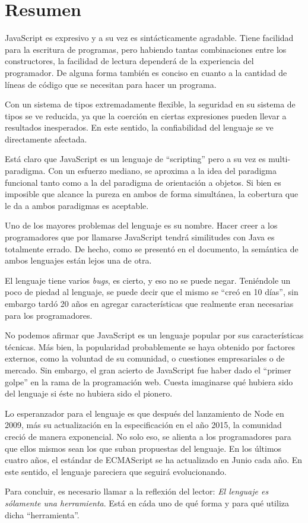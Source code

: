 \section{Resumen}

JavaScript es expresivo y a su vez es sintácticamente agradable. Tiene facilidad para la escritura de programas, pero habiendo tantas combinaciones entre los constructores, la facilidad de lectura dependerá de la experiencia del programador. De alguna forma también es conciso en cuanto a la cantidad de líneas de código que se necesitan para hacer un programa.

Con un sistema de tipos extremadamente flexible, la seguridad en su sistema de tipos se ve reducida, ya que la coerción en ciertas expresiones pueden llevar a resultados inesperados. En este sentido, la confiabilidad del lenguaje se ve directamente afectada. 

Está claro que JavaScript es un lenguaje de "`scripting"' pero a su vez es multi-paradigma. Con un esfuerzo mediano, se aproxima a la idea del paradigma funcional tanto como a la del paradigma de orientación a objetos. Si bien es imposible que alcance la pureza en ambos de forma simultánea, la cobertura que le da a ambos paradigmas es aceptable.

Uno de los mayores problemas del lenguaje es su nombre. Hacer creer a los programadores que por llamarse JavaScript tendrá similitudes con Java es totalmente errado. De hecho, como se presentó en el documento, la semántica de ambos lenguajes están lejos una de otra.

El lenguaje tiene varios \textit{bugs}, es cierto, y eso no se puede negar. Teniéndole un poco de piedad al lenguaje, se puede decir que el mismo se "`creó en 10 días"', sin embargo tardó 20 años en agregar características que realmente eran necesarias para los programadores. 

No podemos afirmar que JavaScript es un lenguaje popular por sus características técnicas. Más bien, la popularidad probablemente se haya obtenido por factores externos, como la voluntad de su comunidad, o cuestiones empresariales o de mercado. Sin embargo, el gran acierto de JavaScript fue haber dado el "`primer golpe"' en la rama de la programación web. Cuesta imaginarse qué hubiera sido del lenguaje si éste no hubiera sido el pionero.

Lo esperanzador para el lenguaje es que después del lanzamiento de Node en 2009, más su actualización en la especificación en el año 2015, la comunidad creció de manera exponencial. No solo eso, se alienta a los programadores para que ellos mismos sean los que suban propuestas del lenguaje. En los últimos cuatro años, el estándar de ECMAScript se ha actualizado en Junio cada año. En este sentido, el lenguaje pareciera que seguirá evolucionando.

Para concluir, es necesario llamar a la reflexión del lector: \textit{El lenguaje es sólamente una herramienta}. Está en cáda uno de qué forma y para qué utiliza dicha "`herramienta"'.